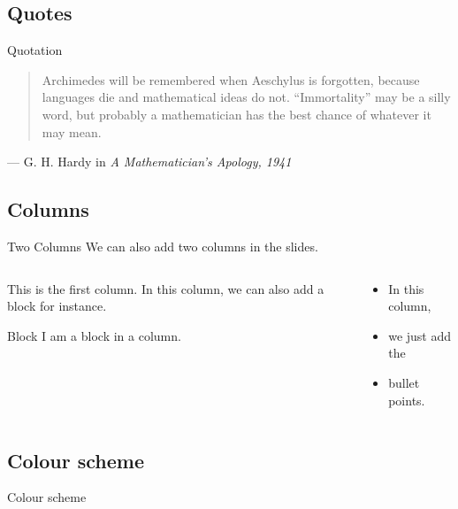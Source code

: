 \documentclass[]{beamer}
\begin{document}
\subsection{Quotes}

\begin{frame}[label=quot]{Quotation}
\begin{quote}
Archimedes will be remembered when Aeschylus is forgotten, because languages die and mathematical ideas do not. ``Immortality'' may be a silly word, but probably a mathematician has the best chance of whatever it may mean.
\end{quote}
\hfill --- G. H. Hardy in \textit{A Mathematician's Apology, 1941}

\end{frame}

\subsection{Columns}

	\begin{frame}{Two Columns}
		We can also add two columns in the slides.
		\begin{columns}[t]
			\begin{column}[T]{0.4\textwidth}
				This is the first column. In this column, we can also add a block for instance.
				\vspace{1em}
				\begin{block}{Block}
					I am a block in a column.
				\end{block}
			\end{column}
			\begin{column}[T]{0.4\textwidth}
				\begin{itemize}
					\item In this column,
					\item we just add the
					\item bullet points.
				\end{itemize}
			\end{column}
		\end{columns}
	\end{frame}

\subsection{Colour scheme}

\begin{frame}{Colour scheme}

%

\end{frame}
\end{document}

